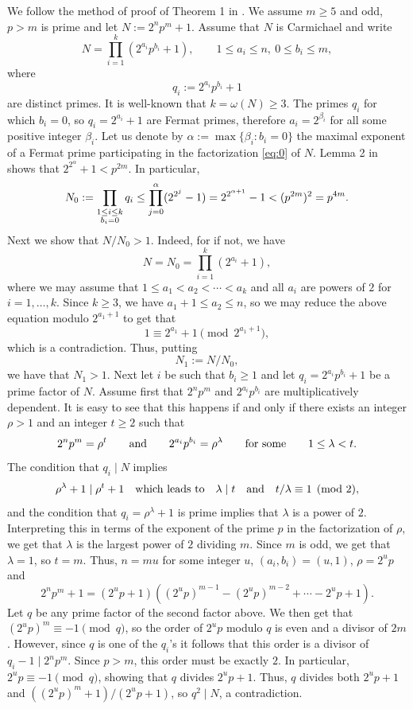 \documentclass[11pt]{article}
\def\\{\cr}
\begin{document}
We follow the method of proof of Theorem 1 in \cite{CLP}. We  assume $m\ge 5$ and odd, $p>m$ is prime and let $N:=2^np^m+1$. Assume that $N$ is Carmichael and write 
\begin{equation}
\label{eq:0}
N=\prod_{i=1}^k (2^{a_i}p^{b_i}+1),\qquad 1\le a_i\le n,~0\le b_i\le m,
\end{equation}
where 
$$
q_{i}:=2^{a_i}p^{b_i}+1
$$
are distinct primes. It is well-known that $k=\omega(N)\ge 3$.  
The primes $q_i$ for which $b_i=0$, so $q_i=2^{a_i}+1$ are Fermat primes, therefore $a_{i}=2^{\beta_i}$ for all some positive integer $\beta_i$. Let us denote by $\alpha:=\max\{\beta_i: b_i=0\}$ the maximal exponent of a Fermat prime participating in the factorization \eqref{eq:0} of $N$. Lemma 2 in \cite{CLP} shows that $2^{2^{\alpha}}+1<p^{2m}$. In particular,
\begin{equation}
\label{eq:N0}
N_0:=\prod_{\substack{1\le i\le k\\ b_i=0}} q_i\le \prod_{j=0}^{\alpha} (2^{2^j}-1)=2^{2^{\alpha+1}}-1<(p^{2m})^2=p^{4m}.
\end{equation}
Next we show that $N/N_0>1$. Indeed, for if not, we have 
$$
N=N_0=\prod_{i=1}^k (2^{a_i}+1),
$$
where we may assume that $1\le a_1<a_2<\cdots<a_k$ and all $a_i$ are powers of $2$ for $i=1,\ldots,k$. Since $k\ge 3$, we have $a_1+1\le a_2\le n$, so we may reduce the above equation modulo $2^{a_1+1}$ to get that
$$
1\equiv 2^{a_1}+1\pmod {2^{a_1+1}},
$$
which is a contradiction. Thus, putting 
\begin{equation}
\label{eq:N1}
N_1:=N/N_0,
\end{equation}
we have that $N_1>1$.  Next let $i$ be such that $b_i\ge 1$ and let $q_{i}=2^{a_i}p^{b_i}+1$ be a prime factor of $N$. Assume first that $2^np^m$ and $2^{a_i}p^{b_i}$ are multiplicatively dependent. It is easy to see that this happens if and only if there exists an integer $\rho>1$ and an integer $t\ge 2$ such that 
$$
2^{n}p^m=\rho^t\qquad {\text{\rm and}}\qquad 2^{a_i}p^{b_i}=\rho^{\lambda}\qquad {\text{\rm for~some}}\qquad 1\le \lambda<t.
$$ 
The condition that $q_i\mid N$ implies
$$
\rho^{\lambda}+1\mid \rho^t+1\quad {\text{\rm which leads to}}\quad \lambda\mid t\quad {\text{\rm and}}\quad t/\lambda\equiv 1\pmod 2,
$$
and the condition that $q_i=\rho^{\lambda}+1$ is prime implies that $\lambda$ is a power of $2$. Interpreting this in terms of the exponent of the prime $p$ in the factorization of $\rho$, we get that $\lambda$ is the largest power of $2$ dividing $m$. 
Since $m$ is odd, we get that $\lambda=1$, so $t=m$. Thus, $n=mu$ for some integer $u$, $(a_i,b_i)=(u,1)$, $\rho=2^up$ and  
$$
2^np^m+1=(2^{u}p+1)((2^{u}p)^{m-1}-(2^up)^{m-2}+\cdots-2^u p+1).
$$
Let $q$ be any prime factor of the second factor above. We then get that $(2^up)^{m}\equiv -1\pmod q$, so the order of $2^up$ modulo $q$ is even and a divisor of $2m$. However, since $q$ is one of the $q_i$'s it follows that this order is a divisor of $q_i-1\mid 2^np^m$.  Since $p>m$, this order must be exactly $2$. In particular, $2^{u}p\equiv -1\pmod q$, showing that $q$ divides $2^{u}p+1$. Thus, 
$q$ divides both $2^up+1$ and $((2^{u}p)^m+1)/(2^up+1)$, so $q^2\mid N$, a contradiction. 
\end{document}
